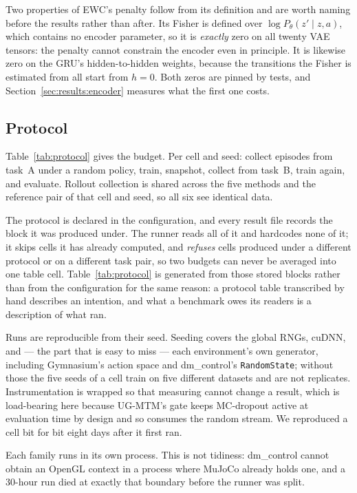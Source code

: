 Two properties of EWC's penalty follow from its definition and are worth naming
before the results rather than after. Its Fisher is defined over
$\log P_\theta(z' \mid z, a)$, which contains no encoder parameter, so it is
\emph{exactly} zero on all twenty VAE tensors: the penalty cannot constrain the
encoder even in principle. It is likewise zero on the GRU's hidden-to-hidden
weights, because the transitions the Fisher is estimated from all start from
$h = 0$. Both zeros are pinned by tests, and
Section~\ref{sec:results:encoder} measures what the first one costs.

\subsection{Protocol}
\label{sec:method:protocol}

\begin{table}[t]
  \centering
  
  \caption{The executed protocol. Generated from the \texttt{protocol} block
  that every result file stores, not transcribed from the configuration.}
  \label{tab:protocol}
\end{table}

Table~\ref{tab:protocol} gives the budget. Per cell and seed: collect episodes
from task~A under a random policy, train, snapshot, collect from task~B, train
again, and evaluate. Rollout collection is shared across the five methods and
the reference pair of that cell and seed, so all six see identical data.

The protocol is declared in the configuration, and every result file records the
block it was produced under. The runner reads all of it and hardcodes none of
it; it skips cells it has already computed, and \emph{refuses} cells produced
under a different protocol or on a different task pair, so two budgets can never
be averaged into one table cell. Table~\ref{tab:protocol} is generated from
those stored blocks rather than from the configuration for the same reason: a
protocol table transcribed by hand describes an intention, and what a benchmark
owes its readers is a description of what ran.

Runs are reproducible from their seed. Seeding covers the global RNGs, cuDNN,
and --- the part that is easy to miss --- each environment's own generator,
including Gymnasium's action space and dm\_control's \texttt{RandomState};
without those the five seeds of a cell train on five different datasets and are
not replicates. Instrumentation is wrapped so that measuring cannot change a
result, which is load-bearing here because UG-MTM's gate keeps MC-dropout active
at evaluation time by design and so consumes the random stream. We reproduced a
cell bit for bit eight days after it first ran.

Each family runs in its own process. This is not tidiness: dm\_control cannot
obtain an OpenGL context in a process where MuJoCo already holds one, and a
30-hour run died at exactly that boundary before the runner was split.
